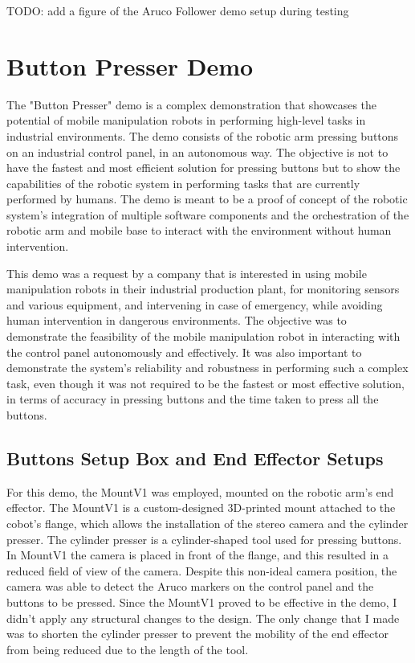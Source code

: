 TODO: add a figure of the Aruco Follower demo setup during testing

\section{Button Presser Demo}

The "Button Presser" demo is a complex demonstration that showcases the potential of mobile manipulation robots
in performing high-level tasks in industrial environments. The demo consists of the robotic arm pressing buttons
on an industrial control panel, in an autonomous way. The objective is not to have the fastest and most 
efficient solution for pressing buttons but to show the capabilities of the robotic system in performing
tasks that are currently performed by humans. The demo is meant to be a proof of concept of the robotic system's
integration of multiple software components and the orchestration of the robotic arm and mobile base to
interact with the environment without human intervention.

This demo was a request by a company that is interested in using mobile manipulation robots in their
industrial production plant, for monitoring sensors and various equipment, and intervening in case of emergency,
while avoiding human intervention in dangerous environments. The objective was to demonstrate the feasibility
of the mobile manipulation robot in interacting with the control panel autonomously and effectively. 
It was also important to demonstrate the system's reliability and robustness in performing such a complex task,
even though it was not required to be the fastest or most effective solution, in terms of accuracy in pressing
buttons and the time taken to press all the buttons.

\subsection{Buttons Setup Box and End Effector Setups}

For this demo, the MountV1 was employed, mounted on the robotic arm's end effector. The MountV1 is a 
custom-designed 3D-printed mount attached to the cobot's flange, which allows the installation of the stereo camera and 
the cylinder presser. The cylinder presser is a cylinder-shaped tool used for pressing buttons.
In MountV1 the camera is placed in front of the flange, and this resulted in a reduced field of view of the camera.
Despite this non-ideal camera position, the camera was able to detect the Aruco markers on the control panel
and the buttons to be pressed. Since the MountV1 proved to be effective in the demo, I didn't apply any
structural changes to the design. The only change that I made was to shorten the cylinder presser to prevent
the mobility of the end effector from being reduced due to the length of the tool.

